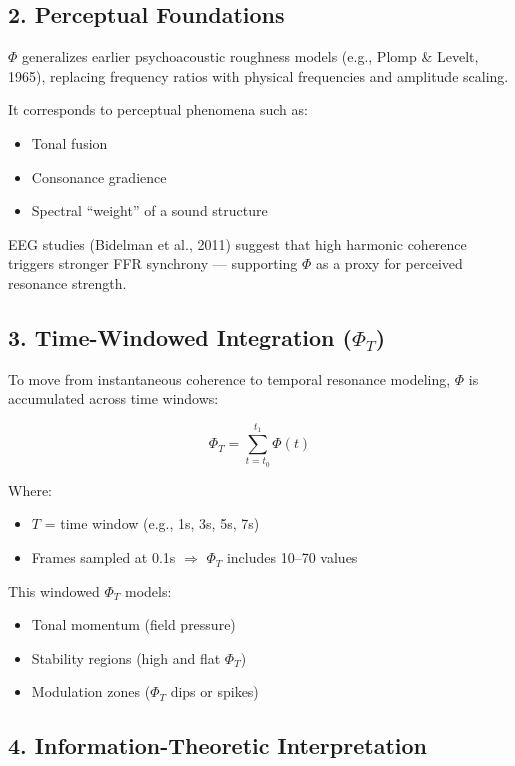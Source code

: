 \subsection*{2. Perceptual Foundations}

$\Phi$ generalizes earlier psychoacoustic roughness models (e.g., Plomp \& Levelt, 1965), replacing frequency ratios with physical frequencies and amplitude scaling.

It corresponds to perceptual phenomena such as:

\begin{itemize}
    \item Tonal fusion
    \item Consonance gradience
    \item Spectral “weight” of a sound structure
\end{itemize}

EEG studies (Bidelman et al., 2011) suggest that high harmonic coherence triggers stronger FFR synchrony — supporting $\Phi$ as a proxy for perceived resonance strength.

\subsection*{3. Time-Windowed Integration ($\Phi_T$)}

To move from instantaneous coherence to temporal resonance modeling, $\Phi$ is accumulated across time windows:

\[
\Phi_T = \sum_{t=t_0}^{t_1} \Phi(t)
\]

Where:

\begin{itemize}
    \item $T$ = time window (e.g., 1s, 3s, 5s, 7s)
    \item Frames sampled at 0.1s $\Rightarrow$ $\Phi_T$ includes 10–70 values
\end{itemize}

This windowed $\Phi_T$ models:

\begin{itemize}
    \item Tonal momentum (field pressure)
    \item Stability regions (high and flat $\Phi_T$)
    \item Modulation zones ($\Phi_T$ dips or spikes)
\end{itemize}

\subsection*{4. Information-Theoretic Interpretation}

